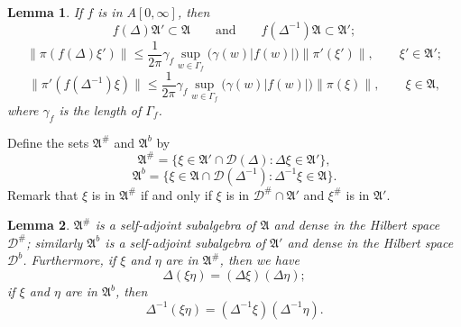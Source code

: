 \documentclass[12pt,b5paper,twoside]{article}
\theoremstyle{takesaki}
\newtheorem{lemma}{Lemma}[section]
\numberwithin{equation}{section}
\begin{document}
\begin{lemma}\label{lem:8.2}
If $f$ is in $A[0,\infty]$, then
\[
  f(\Delta)\mathfrak A'\subset\mathfrak A
  \qquad\text{and}\qquad
  f(\Delta^{-1})\mathfrak A\subset\mathfrak A';
\]
\begin{equation}
  \|\pi(f(\Delta)\xi')\|
  \leq \frac{1}{2\pi}\gamma_f
  \sup_{w\in\Gamma_f}\bigl(\gamma(w)|f(w)|\bigr)
  \|\pi'(\xi')\|,
  \qquad \xi'\in\mathfrak A';
  \tag{8.5}\label{eq:8.5}
\end{equation}
\begin{equation}
  \|\pi'(f(\Delta^{-1})\xi)\|
  \leq \frac{1}{2\pi}\gamma_f
  \sup_{w\in\Gamma_f}\bigl(\gamma(w)|f(w)|\bigr)
  \|\pi(\xi)\|,
  \qquad \xi\in\mathfrak A,
  \tag{8.5$'$}\label{eq:8.5-prime}
\end{equation}
where $\gamma_f$ is the length of $\Gamma_f$.
\end{lemma}

Define the sets $\mathfrak A^{\#}$ and $\mathfrak A^b$ by
\[
  \mathfrak A^{\#}
  =\{\xi\in\mathfrak A'\cap\mathcal D(\Delta):
      \Delta\xi\in\mathfrak A'\},
\]
\[
  \mathfrak A^b
  =\{\xi\in\mathfrak A\cap\mathcal D(\Delta^{-1}):
      \Delta^{-1}\xi\in\mathfrak A\}.
\]
Remark that $\xi$ is in $\mathfrak A^{\#}$ if and only if $\xi$ is in
$\mathcal D^{\#}\cap\mathfrak A'$ and $\xi^{\#}$ is in $\mathfrak A'$.

\begin{lemma}\label{lem:8.3}
$\mathfrak A^{\#}$ is a self-adjoint subalgebra of $\mathfrak A$ and
dense in the Hilbert space $\mathcal D^{\#}$; similarly
$\mathfrak A^b$ is a self-adjoint subalgebra of $\mathfrak A'$ and
dense in the Hilbert space $\mathcal D^b$.  Furthermore, if $\xi$ and
$\eta$ are in $\mathfrak A^{\#}$, then we have
\begin{equation}
  \Delta(\xi\eta)=(\Delta\xi)(\Delta\eta);
  \tag{8.6}\label{eq:8.6}
\end{equation}
if $\xi$ and $\eta$ are in $\mathfrak A^b$, then
\begin{equation}
  \Delta^{-1}(\xi\eta)=(\Delta^{-1}\xi)(\Delta^{-1}\eta).
  \tag{8.6$'$}\label{eq:8.6-prime}
\end{equation}
\end{lemma}
\end{document}
